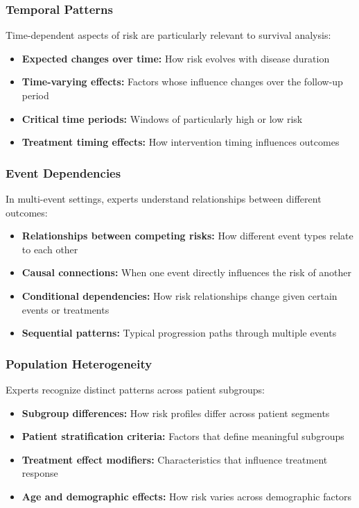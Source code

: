 \subsubsection{Temporal Patterns}

Time-dependent aspects of risk are particularly relevant to survival analysis:

\begin{itemize}
    \item \textbf{Expected changes over time:} How risk evolves with disease duration
    \item \textbf{Time-varying effects:} Factors whose influence changes over the follow-up period
    \item \textbf{Critical time periods:} Windows of particularly high or low risk
    \item \textbf{Treatment timing effects:} How intervention timing influences outcomes
\end{itemize}

\subsubsection{Event Dependencies}

In multi-event settings, experts understand relationships between different outcomes:

\begin{itemize}
    \item \textbf{Relationships between competing risks:} How different event types relate to each other
    \item \textbf{Causal connections:} When one event directly influences the risk of another
    \item \textbf{Conditional dependencies:} How risk relationships change given certain events or treatments
    \item \textbf{Sequential patterns:} Typical progression paths through multiple events
\end{itemize}

\subsubsection{Population Heterogeneity}

Experts recognize distinct patterns across patient subgroups:

\begin{itemize}
    \item \textbf{Subgroup differences:} How risk profiles differ across patient segments
    \item \textbf{Patient stratification criteria:} Factors that define meaningful subgroups
    \item \textbf{Treatment effect modifiers:} Characteristics that influence treatment response
    \item \textbf{Age and demographic effects:} How risk varies across demographic factors
\end{itemize}

